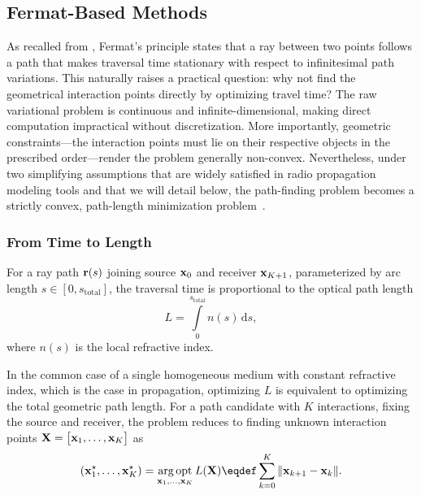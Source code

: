 \subsection{Fermat-Based Methods}

As recalled from , Fermat's principle states that a ray between two points follows a path that makes traversal time stationary with respect to infinitesimal path variations. This naturally raises a practical question: why not find the geometrical interaction points directly by optimizing travel time? The raw variational problem is continuous and infinite-dimensional, making direct computation impractical without discretization. More importantly, geometric constraints---the interaction points must lie on their respective objects in the prescribed order---render the problem generally non-convex. Nevertheless, under two simplifying assumptions that are widely satisfied in radio propagation modeling tools and that we will detail below, the path-finding problem becomes a strictly convex, path-length minimization problem~.

\subsubsection{From Time to Length}

For a ray path $\mathbf{r}(s)$ joining source $\mathbf{x}_0$ and receiver $\mathbf{x}_{K+1}$, parameterized by arc length $s\in[0,s_{\text{total}}]$, the traversal time is proportional to the optical path length
\begin{equation}
  L = \int\limits_{0}^{s_{\text{total}}} n(s) \, \mathrm{d}s,
\end{equation}
where $n(s)$ is the local refractive index.

In the common case of a single homogeneous medium with constant refractive index, which is the case in  propagation, optimizing $L$ is equivalent to optimizing the total geometric path length. For a path candidate with $K$ interactions, fixing the source and receiver, the problem reduces to finding unknown interaction points $\mathbf{X} =
\begin{bmatrix}\mathbf{x}_1,\ldots,\mathbf{x}_{K}
\end{bmatrix}$ as
\begin{equation}\label{eq:fermat_min}
  (\bsup{x}_1^\star,\ldots,\bsup{x}_{K}^\star) = \argopt_{\bsup{x}_1,\ldots,\bsup{x}_{K}} L(\bsup{X}) \eqdef \sum_{k=0}^{K} \|\bsup{x}_{k+1}-\bsup{x}_k\|.
\end{equation}

